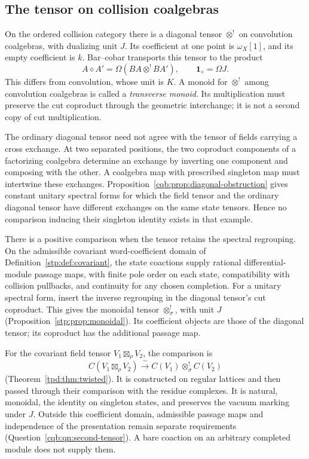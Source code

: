 \subsection{The tensor on collision coalgebras}

On the ordered collision category there is a diagonal tensor
\(\otimes^!\) on convolution coalgebras, with dualizing unit
\(J\). Its coefficient at one point is \(\omega_X[1]\),
and its empty coefficient is \(k\). Bar--cobar transports
this tensor to the product
\[
 A\diamond A'=\Omega(BA\otimes^!BA'),
 \qquad \mathbf1_\diamond=\Omega J.
\]
This differs from convolution, whose unit is \(K\).
A monoid for \(\otimes^!\) among convolution coalgebras
is called a \emph{transverse monoid}. Its multiplication
must preserve the cut coproduct through the geometric
interchange; it is not a second copy of cut multiplication.

The ordinary diagonal tensor need not agree with the
tensor of fields carrying a cross exchange. At two
separated positions, the two coproduct components of a
factorizing coalgebra determine an exchange by inverting
one component and composing with the other. A coalgebra
map with prescribed singleton map must intertwine these
exchanges. Proposition~\ref{cqb:prop:diagonal-obstruction}
gives constant unitary spectral forms for which the field
tensor and the ordinary diagonal tensor have different
exchanges on the same state tensors. Hence no comparison
inducing their singleton identity exists in that example.

There is a positive comparison when the tensor retains
the spectral regrouping. On the admissible covariant word-coefficient
domain of Definition~\ref{stp:def:covariant}, the state
coactions supply rational differential-module passage
maps, with finite pole order on each state, compatibility
with collision pullbacks, and continuity for any chosen
completion. For a unitary spectral form, insert the
inverse regrouping in the diagonal tensor's cut
coproduct. This gives the monoidal tensor
\(\otimes^!_\sigma\), with unit \(J\)
(Proposition~\ref{stp:prop:monoidal}). Its coefficient
objects are those of the diagonal tensor; its coproduct
has the additional passage map.

For the covariant field tensor \(V_1\boxtimes_\rho V_2\),
the comparison is
\[
 C(V_1\boxtimes_\rho V_2)
       \xrightarrow{\ \sim\ }
 C(V_1)\otimes^!_\sigma C(V_2)
\]
(Theorem~\ref{tpd:thm:twisted}). It is constructed on
regular lattices and then passed through their comparison
with the residue complexes. It is natural, monoidal,
the identity on singleton states, and preserves the
vacuum marking under \(J\). Outside this coefficient
domain, admissible passage maps and independence of the
presentation remain separate requirements
(Question~\ref{cqb:qn:second-tensor}). A bare coaction
on an arbitrary completed module does not supply them.

